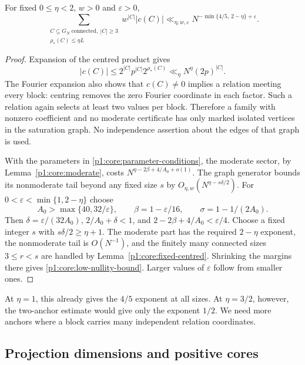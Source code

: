 \begin{theorem}
\label{p1:core:low-nullity}
For fixed $0\le\eta<2$, $w>0$ and $\varepsilon>0$,
\begin{equation}
 \sum_{\substack{C\subseteq G_N\ \mathrm{connected},\ |C|\ge3\\
                  \rho_*(C)\le\eta L}}
 w^{|C|}|c(C)|
 \ll_{\eta,w,\varepsilon}
 N^{-\min\{4/5,\,2-\eta\}+\varepsilon}.
 \label{p1:core:low-nullity-bound}
\end{equation}
\end{theorem}
\begin{proof}
Expansion of the centred product gives
\begin{equation}
 |c(C)|\le 2^{|C|}p^{|C|}2^{\rho_*(C)}
       \ll_\eta N^\eta(2p)^{|C|}.
 \label{p1:core:compatible-majorant}
\end{equation}
The Fourier expansion also shows that $c(C)\ne0$ implies a relation
meeting every block: centring removes the zero Fourier coordinate in
each factor. Such a relation again selects at least two values per
block. Therefore a family with nonzero coefficient and no moderate
certificate has only marked isolated vertices in the saturation graph.
No independence assertion about the edges of that graph is used.

With the parameters in \eqref{p1:core:parameter-conditions}, the
moderate sector, by Lemma~\ref{p1:core:moderate}, costs
$N^{\eta-2\beta+4/A_0+o(1)}$. The graph generator bounds its
nonmoderate tail beyond any fixed size $s$ by
$O_{\eta,w}(N^{\eta-s\delta/2})$.
For $0<\varepsilon<\min\{1,2-\eta\}$ choose
\[
 A_0>\max\{40,32/\varepsilon\},\qquad
 \beta=1-\varepsilon/16,\qquad
 \sigma=1-1/(2A_0).
\]
Then $\delta=\varepsilon/(32A_0)$, $2/A_0+\delta<1$, and
$2-2\beta+4/A_0<\varepsilon/4$. Choose a fixed integer $s$ with
$s\delta/2\ge\eta+1$. The moderate part has the required
$2-\eta$ exponent, the nonmoderate tail is $O(N^{-1})$, and
the finitely many connected sizes $3\le r<s$ are handled by
Lemma~\ref{p1:core:fixed-centred}.
Shrinking the margins there gives \eqref{p1:core:low-nullity-bound}.
Larger values of $\varepsilon$ follow from smaller ones.
\end{proof}

At $\eta=1$, this already gives the $4/5$ exponent at all sizes.
At $\eta=3/2$, however, the two-anchor estimate would give only
the exponent $1/2$. We need more anchors where a block carries many
independent relation coordinates.

\subsection{Projection dimensions and positive cores}


